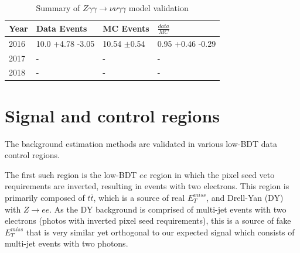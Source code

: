 \begin{table}[h]
	\centering
	\caption{Summary of $Z \gamma \gamma \rightarrow \nu \nu \gamma \gamma$ model validation}
	\begin{tabular}{|l|l|l|l|}
		\hline
		Year & Data Events & MC Events & $\frac{data}{MC}$ \\
		\hline
		\hline
		2016 & 10.0 +4.78 -3.05 & 10.54 $\pm$0.54 & 0.95 +0.46 -0.29 \\
		\hline
		2017 & - & - & - \\
		\hline
		2018 & - & - & - \\
		\hline
	\end{tabular}
	\label{table:ZGGtonunuGG}
\end{table}

\section{Signal and control regions}
The background estimation methods are validated in various low-BDT data control regions.  

The first such region is the low-BDT $ee$ region in which the pixel seed veto requirements are inverted, resulting in events with two electrons.  This region is primarily composed of $t\bar{t}$, which is a source of real $E_T^{miss}$, and Drell-Yan (DY) with $Z\rightarrow ee$.  As the DY background is comprised of multi-jet events with two electrons (photos with inverted pixel seed requirements), this is a source of fake $E_T^{miss}$ that is very similar yet orthogonal to our expected signal which consists of multi-jet events with two photons.